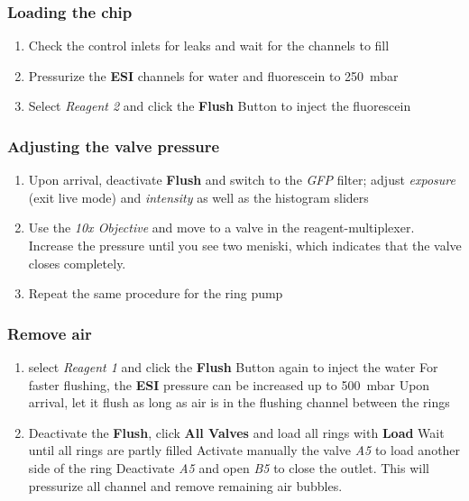 \documentclass{article}
\newcounter{ListCounter}
\begin{document}
	\subsubsection{Loading the chip}
		\begin{enumerate}
			\setcounter{enumi}{\value{ListCounter}}
	\item Check the control inlets for leaks and wait for the channels to fill
	\item Pressurize the \textbf{ESI} channels for water and fluorescein to \SI{250}{\milli\bar}
	\item Select \textit{Reagent 2} and click the \textbf{Flush} Button to inject the fluorescein
		\setcounter{ListCounter}{\value{enumi}}
	\end{enumerate}
		
	\subsubsection{Adjusting the valve pressure}
	\begin{enumerate}                 
	\setcounter{enumi}{\value{ListCounter}}
	\item Upon arrival, deactivate \textbf{Flush} and switch to the \textit{GFP} filter; adjust \textit{exposure} (exit live mode) and \textit{intensity} as well as the histogram sliders
	\item Use the \textit{10x Objective} and move to a valve in the reagent-multiplexer.
	\subitem Increase the pressure until you see two meniski, which indicates that the valve closes completely.
	\item Repeat the same procedure for the ring pump	\setcounter{ListCounter}{\value{enumi}}
\end{enumerate}


	
	\subsubsection{Remove air}
			\begin{enumerate}
		\setcounter{enumi}{\value{ListCounter}}
	\item select \textit{Reagent 1} and click the \textbf{Flush} Button again to inject the water
	\subitem For faster flushing, the \textbf{ESI} pressure can be increased up to \SI{500}{\milli \bar}  
	\subitem Upon arrival, let it flush as long as air is in the flushing channel between the rings
	\item Deactivate the \textbf{Flush}, click \textbf{All Valves} and load all rings with \textbf{Load}
	\subitem Wait until all rings are partly filled
	\subitem Activate manually the valve \textit{A5} to load another side of the ring
	\subitem Deactivate \textit{A5} and open \textit{B5} to close the outlet.
	\subitem This will pressurize all channel and remove remaining air bubbles.
		\setcounter{ListCounter}{\value{enumi}}
\end{enumerate}
\end{document}
